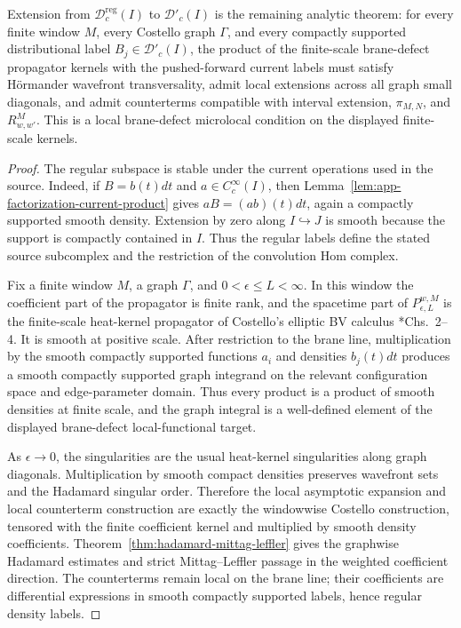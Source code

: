 \begin{prop}
  Extension from \(\mathcal D^{\mathrm{reg}}_c(I)\) to
  \(\mathcal D'_c(I)\) is the remaining analytic theorem: for every
  finite window \(M\), every Costello graph \(\Gamma\), and
  every compactly supported distributional label
  \(B_j\in\mathcal D'_c(I)\), the product of the finite-scale
  brane-defect propagator kernels with the pushed-forward current labels
  must satisfy H\"ormander wavefront transversality, admit local
  extensions across all graph small diagonals, and admit counterterms
  compatible with interval extension, \(\pi_{M,N}\), and \(R^M_{w,w'}\).
  This is a local brane-defect microlocal condition on the displayed
  finite-scale kernels.
\end{prop}

\begin{proof}
  The regular subspace is stable under the current operations used in the
  source.  Indeed, if \(B=b(t)dt\) and \(a\in C^\infty_c(I)\), then
  Lemma~\ref{lem:app-factorization-current-product} gives
  \(aB=(ab)(t)dt\), again a compactly supported smooth density.  Extension
  by zero along \(I\hookrightarrow J\) is smooth because the support is
  compactly contained in \(I\).  Thus the regular labels define the stated
  source subcomplex and the restriction of the convolution Hom complex.

  Fix a finite window \(M\), a graph \(\Gamma\), and
  \(0<\epsilon\leq L<\infty\).  In this window the coefficient part of
  the propagator is finite rank, and the spacetime part of
  \(P_{\epsilon,L}^{w,M}\) is the finite-scale heat-kernel propagator of
  Costello's elliptic BV calculus
  \cite{costello-renormalization}*{Chs.~2--4}.  It is smooth at positive scale.  After
  restriction to the brane line, multiplication by the smooth compactly
  supported functions \(a_i\) and densities \(b_j(t)dt\) produces a smooth
  compactly supported graph integrand on the relevant configuration space
	  and edge-parameter domain.  Thus every product is a product of smooth
	  densities at finite scale, and the graph integral is a well-defined element
  of the displayed brane-defect local-functional target.

	  As \(\epsilon\to0\), the singularities are the usual heat-kernel
	  singularities along graph diagonals.  Multiplication by smooth compact
	  densities preserves wavefront sets and the Hadamard singular order.
	  Therefore the local asymptotic expansion and
  local counterterm construction are exactly the windowwise Costello
  construction, tensored with the finite coefficient kernel and multiplied
  by smooth density coefficients.  Theorem~\ref{thm:hadamard-mittag-leffler}
  gives the graphwise Hadamard estimates and strict Mittag--Leffler
  passage in the weighted coefficient direction.  The counterterms remain
  local on the brane line; their coefficients are differential expressions
  in smooth compactly supported labels, hence regular density labels.


\end{proof}
